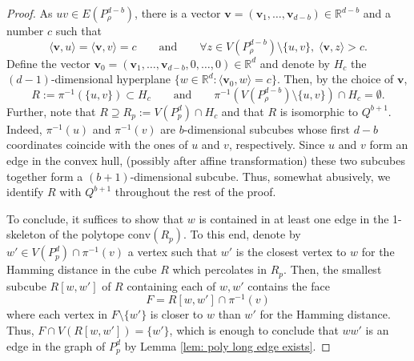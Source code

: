 \documentclass{article}
\theoremstyle{definition}
\begin{document}
\begin{proof}
As $uv\in E(P^{d-b}_{\rho})$, there is a vector $\mathbf{v}=(\mathbf{v}_1,\ldots,\mathbf{v}_{d-b})\in \mathbb R^{d-b}$ and a number $c$ such that
\[\langle \mathbf{v},u\rangle = \langle \mathbf{v},v\rangle = c\qquad \text{and}\qquad \forall z\in V(P^{d-b}_\rho)\setminus \{u,v\},\; \langle \mathbf{v},z\rangle > c.\]
Define the vector $\mathbf{v}_0 = (\mathbf{v}_1,\ldots,\mathbf{v}_{d-b},0,\ldots,0)\in \mathbb R^d$ and denote by $H_c$ the $(d-1)$-dimensional hyperplane $\{w\in \mathbb R^d: \langle \mathbf{v}_0,w\rangle = c\}$.
Then, by the choice of $\mathbf{v}$, 
\[R := \pi^{-1}(\{u,v\})\subset H_c\qquad \text{and}\qquad \pi^{-1}(V(P^{d-b}_\rho)\setminus \{u,v\})\cap H_c=\emptyset.\]
Further, note that $R \supseteq R_p := V(P^d_p)\cap H_c$ and that
$R$ is isomorphic to $Q^{b+1}$. Indeed, $\pi^{-1}(u)$ and
$\pi^{-1}(v)$ are $b$-dimensional subcubes whose first $d-b$
coordinates coincide with the ones of $u$ and $v$, respectively. Since $u$ and
$v$ form an edge in the convex hull, (possibly after affine transformation) these two subcubes together
form a $(b+1)$-dimensional subcube. Thus, somewhat abusively, we
identify $R$ with $Q^{b+1}$ throughout the rest of the proof.

To conclude, it suffices to show that $w$ is contained in at least one edge in the 1-skeleton of the polytope $\mathrm{conv}(R_p)$.
To this end, denote by $w'\in V(P^d_p)\cap \pi^{-1}(v)$ a vertex such that $w'$ is the closest vertex to $w$ for the Hamming distance in the cube $R$ which percolates in $R_p$.
Then, the smallest subcube $R[w,w']$ of $R$ containing each of $w,w'$ contains the face 
\[F = R[w,w']\cap \pi^{-1}(v)\]
where each vertex in $F\setminus \{w'\}$ is closer to $w$ than $w'$ for the Hamming distance.
Thus, $F\cap V(R[w,w'])=\{w'\}$, which is enough to conclude that $ww'$ is an edge in the graph of $P^d_p$ by Lemma \ref{lem: poly long edge exists}.
\end{proof}
\end{document}
